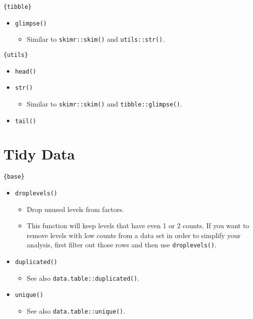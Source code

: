 \documentclass[
]{book}
\providecommand{\tightlist}{%
  \setlength{\itemsep}{0pt}\setlength{\parskip}{0pt}}
\begin{document}
\texttt{\{tibble\}}

\begin{itemize}
\tightlist
\item
  \texttt{glimpse()}

  \begin{itemize}
  \tightlist
  \item
    Similar to \texttt{skimr::skim()} and \texttt{utils::str()}.
  \end{itemize}
\end{itemize}

\texttt{\{utils\}}

\begin{itemize}
\tightlist
\item
  \texttt{head()}
\item
  \texttt{str()}

  \begin{itemize}
  \tightlist
  \item
    Similar to \texttt{skimr::skim()} and \texttt{tibble::glimpse()}.
  \end{itemize}
\item
  \texttt{tail()}
\end{itemize}

\hypertarget{tidy-data}{%
\section{Tidy Data}\label{tidy-data}}

\texttt{\{base\}}

\begin{itemize}
\tightlist
\item
  \texttt{droplevels()}

  \begin{itemize}
  \tightlist
  \item
    Drop unused levels from factors.
  \item
    This function will keep levels that have even 1 or 2 counts. If you want to remove levels with low counts from a data set in order to simplify your analysis, first filter out those rows and then use \texttt{droplevels()}.
  \end{itemize}
\item
  \texttt{duplicated()}

  \begin{itemize}
  \tightlist
  \item
    See also \texttt{data.table::duplicated()}.
  \end{itemize}
\item
  \texttt{unique()}

  \begin{itemize}
  \tightlist
  \item
    See also \texttt{data.table::unique()}.
  \end{itemize}
\end{itemize}
\end{document}
